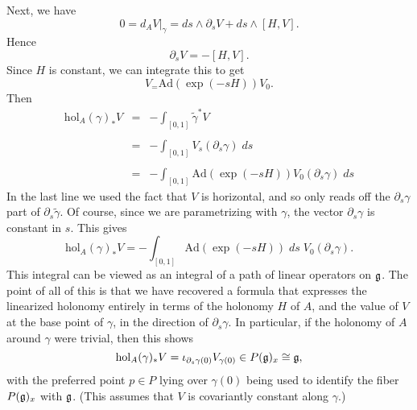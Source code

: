 \documentclass{article}
\newcommand{\intd}[1]{\displaystyle \int_{#1}}
\newcommand{\hol}{{\mathrm{hol}}}
\begin{document}
Next, we have 
$$0 = d_A V \vert_\gamma = d s \wedge \partial_s V + d s \wedge \left[ H , V \right] .$$
Hence
$$\partial_s V = -\left[H, V \right].$$
Since $H$ is constant, we can integrate this to get
$$V_ = \mathrm{Ad}(\exp(-s H)) V_0.$$
Then
$$\begin{array}{rcl}
\hol_A(\gamma)_* V & = & - \intd{\left[ 0, 1 \right]} \widetilde{\gamma}^* V \\
&&\\
& = & - \intd{\left[ 0, 1 \right]}  V_{s} (\partial_s \gamma) \; ds \\
&&\\
& = & - \intd{\left[ 0, 1 \right]} \mathrm{Ad}(\exp(-s H)) V_0(\partial_s \gamma) \; d s
\end{array}$$
In the last line we used the fact that $V$ is horizontal, and so only reads off the $\partial_s \gamma$ part of $\partial_s \widetilde{\gamma}$. Of course, since we are parametrizing with $\gamma$, the vector $\partial_s \gamma$ is constant in $s$. This gives
$$\hol_A(\gamma)_* V = - \intd{\left[ 0, 1 \right]} \mathrm{Ad}(\exp(-s H)) \; d s  \; V_0(\partial_s \gamma).$$ 
This integral can be viewed as an integral of a path of linear operators on $\frak{g}$. The point of all of this is that we have recovered a formula that expresses the linearized holonomy entirely in terms of the holonomy $H$ of $A$, and the value of $V$ at the base point of $\gamma$, in the direction of $\partial_s \gamma$. In particular, if the holonomy of $A$ around $\gamma$ were trivial, then this shows
$$\hol_A(\gamma)_* V = \iota_{\partial_s \gamma(0)} V_{\gamma(0)}  \in P(\frak{g})_x \cong \frak{g},$$
with the preferred point $p \in P$ lying over $\gamma(0)$ being used to identify the fiber $P(\frak{g})_x$ with $\frak{g}$. (This assumes that $V$ is covariantly constant along $\gamma$.)
\end{document}
